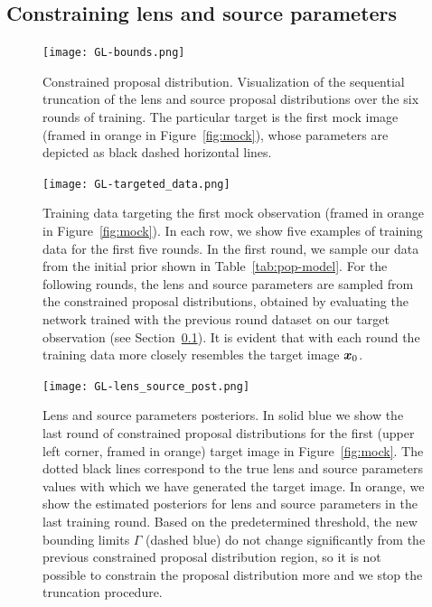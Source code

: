 \subsection{Constraining lens and source parameters}
\label{subsec:constrain}

\begin{figure}
	\centering
	\texttt{[image: GL-bounds.png]}
	\caption{Constrained proposal distribution. Visualization of the sequential truncation of the lens and source proposal distributions over the six rounds of training. The particular target is the first mock image (framed in orange in Figure~\ref{fig:mock}), whose parameters are depicted as black dashed horizontal lines.}
\label{fig:bounds}
\end{figure}

\begin{figure}
	\centering
	\texttt{[image: GL-targeted\_data.png]}
	\caption{Training data targeting the first mock observation (framed in orange in Figure~\ref{fig:mock}). In each row, we show five examples of training data for the first five rounds. In the first round, we sample our data from the initial prior shown in Table~\ref{tab:pop-model}. For the following rounds, the lens and source parameters are sampled from the constrained proposal distributions, obtained by evaluating the network trained with the previous round dataset on our target observation (see Section~\ref{subsec:constrain}). It is evident that with each round the training data more closely resembles the target image $\bm{x}_0$.}
\label{fig:targeted_data}
\end{figure}

\begin{figure}
	\centering
	\texttt{[image: GL-lens\_source\_post.png]}
	\caption{Lens and source parameters posteriors. In solid blue we show the last round of constrained proposal distributions for the first (upper left corner, framed in orange) target image in Figure~\ref{fig:mock}. The dotted black lines correspond to the true lens and source parameters values with which we have generated the target image. In orange, we show the estimated posteriors for lens and source parameters in the last training round. Based on the predetermined threshold, the new bounding limits $\Gamma$ (dashed blue) do not change significantly from the previous constrained proposal distribution region, so it is not possible to constrain the proposal distribution more and we stop the truncation procedure.}
\label{fig:lens_source_post}
\end{figure}

